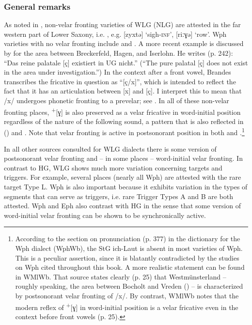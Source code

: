 \subsubsection{General remarks}
As noted in , non-velar fronting varieties of WLG (NLG) are attested in the far western part of Lower Saxony, i.e. , e.g. [zyxtə] ‘sigh\textsc{{}-inf}’, [riːɣə] ‘row’. Wph varieties with no velar fronting include  \citep[13]{Rakers1944} and  \citep{Holtmann1939}. A more recent example is discussed by \citet{Brandes2011} for the area between Breckerfeld, Hagen, and Iserlohn. He writes (p. 242): “Das reine palatale [ç] existiert in UG nicht.” (“The pure palatal [ç] does not exist in the area under investigation.”) In the context after a front vowel, Brandes transcribes the fricative in question as “[ç/x]”, which is intended to reflect the fact that it has an articulation between [x] and [ç]. I interpret this to mean that /x/ undergoes phonetic fronting to a prevelar; see . In all of these non-velar fronting places,  \textsuperscript{+}[ɣ] is also preserved as a velar fricative in word-initial position regardless of the nature of the following sound, a pattern that is also reflected in  (\citealt{Herdemann1921}) and  \citep{Wix1921}. Note that velar fronting is active in postsonorant position in both  and .\footnote{According to the section on pronunciation (p. 377) in the dictionary for the Wph dialect (WphWb), the StG ich-Laut is absent in most varieties of Wph. This is a peculiar assertion, since it is blatantly contradicted by the studies on Wph cited throughout this book. A more realistic statement can be found in WMlWb. That source states clearly (p. 25) that Westmünsterland -- roughly speaking, the area between Bocholt and Vreden () -- is characterized by postsonorant velar fronting of /x/. By contrast, WMlWb notes that the modern reflex of  \textsuperscript{+}[ɣ] in word-initial position is a velar fricative even in the context before front vowels (p. 25).}

In all other sources consulted for WLG dialects there is some version of postsonorant velar fronting and -- in some places -- word-initial velar fronting. In contrast to HG, WLG shows much more variation concerning targets and triggers. For example, several places (nearly all Wph) are attested with the rare target Type L. Wph is also important because it exhibits variation in the types of segments that can serve as triggers, i.e. rare Trigger Types A and B are both attested. Wph and Eph also contrast with HG in the sense that some version of word-initial velar fronting can be shown to be synchronically active.

